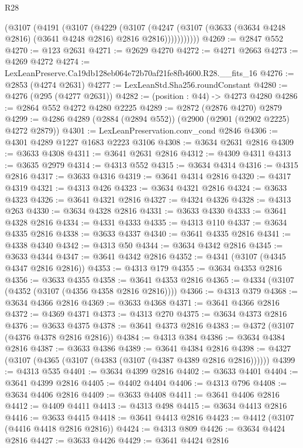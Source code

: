 \begin{lexlean}{R28}
\begin{coremodule}
          (@3107
            (@4191
              (@3107
                (@4229
                  (@3107
                    (@4247
                      (@3107 (@3633 (@3634 @4248 @2816) (@3641 @4248 @2816) @2816 @2816)))))))))))
@4269 := @2847 @552
@4270 := @123 @2631
@4271 := @2629 @4270
@4272 := @4271 @2663
@4273 := @4269 @4272
@4274 := LexLeanPreserve.Ca19db128eb064e72b70af21fe8fb4600.R28.__fits_16
@4276 := @2853 (@4274 @2631)
@4277 := LexLeanStd.Sha256.roundConstant
@4280 := @4276 (@295 (@4277 @2631))
@4282 := (position : @44) -> @4273 @4280
@4286 := @2864 @552 @4272 @4280 @2225
@4289 := @2872 (@2876 @4270) @2879
@4299 := @4286 @4289 (@2884 (@2894 @552)) (@2900 (@2901 (@2902 @2225) @4272 @2879))
@4301 := LexLeanPreservation.conv_cond @2846
@4306 := @4301 @4289 @1227 @1683 @2223 @3106
@4308 := @3634 @2631 @2816
@4309 := @3633 @4308
@4311 := @3641 @2631 @2816
@4312 := @4309 @4311
@4313 := @3635 @2979
@4314 := @4313 @552
@4315 := @3634 @4314
@4316 := @4315 @2816
@4317 := @3633 @4316
@4319 := @3641 @4314 @2816
@4320 := @4317 @4319
@4321 := @4313 @426
@4323 := @3634 @4321 @2816
@4324 := @3633 @4323
@4326 := @3641 @4321 @2816
@4327 := @4324 @4326
@4328 := @4313 @263
@4330 := @3634 @4328 @2816
@4331 := @3633 @4330
@4333 := @3641 @4328 @2816
@4334 := @4331 @4333
@4335 := @4313 @110
@4337 := @3634 @4335 @2816
@4338 := @3633 @4337
@4340 := @3641 @4335 @2816
@4341 := @4338 @4340
@4342 := @4313 @50
@4344 := @3634 @4342 @2816
@4345 := @3633 @4344
@4347 := @3641 @4342 @2816
@4352 := @4341 (@3107 (@4345 @4347 @2816 @2816))
@4353 := @4313 @179
@4355 := @3634 @4353 @2816
@4356 := @3633 @4355
@4358 := @3641 @4353 @2816
@4365 := @4334 (@3107 (@4352 (@3107 (@4356 @4358 @2816 @2816))))
@4366 := @4313 @379
@4368 := @3634 @4366 @2816
@4369 := @3633 @4368
@4371 := @3641 @4366 @2816
@4372 := @4369 @4371
@4373 := @4313 @270
@4375 := @3634 @4373 @2816
@4376 := @3633 @4375
@4378 := @3641 @4373 @2816
@4383 := @4372 (@3107 (@4376 @4378 @2816 @2816))
@4384 := @4313 @384
@4386 := @3634 @4384 @2816
@4387 := @3633 @4386
@4389 := @3641 @4384 @2816
@4398 := @4327 (@3107 (@4365 (@3107 (@4383 (@3107 (@4387 @4389 @2816 @2816))))))
@4399 := @4313 @535
@4401 := @3634 @4399 @2816
@4402 := @3633 @4401
@4404 := @3641 @4399 @2816
@4405 := @4402 @4404
@4406 := @4313 @796
@4408 := @3634 @4406 @2816
@4409 := @3633 @4408
@4411 := @3641 @4406 @2816
@4412 := @4409 @4411
@4413 := @4313 @498
@4415 := @3634 @4413 @2816
@4416 := @3633 @4415
@4418 := @3641 @4413 @2816
@4423 := @4412 (@3107 (@4416 @4418 @2816 @2816))
@4424 := @4313 @809
@4426 := @3634 @4424 @2816
@4427 := @3633 @4426
@4429 := @3641 @4424 @2816

\end{coremodule}
\end{lexlean}
